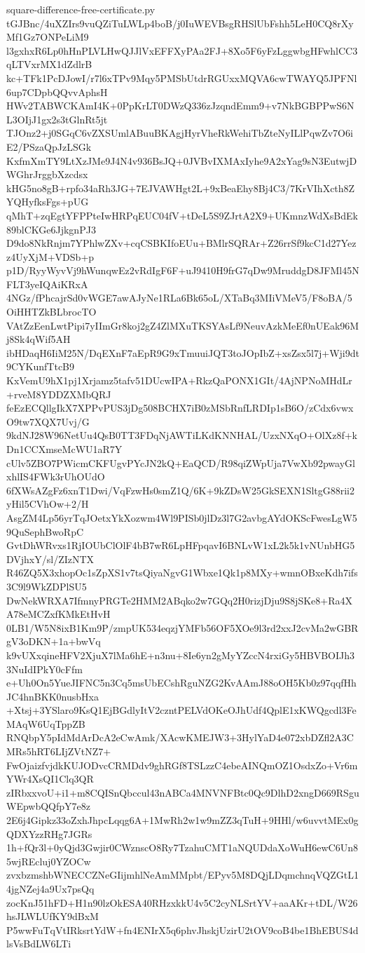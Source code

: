 \documentclass[11pt]{article}
\theoremstyle{definition}
\theoremstyle{remark}
\begin{document}
\begin{filecontents*}[overwrite]{square-difference-free-certificate.py}
tGJBnc/4uXZIrs9vuQZiTuLWLp4boB/j0IuWEVBsgRHSlUbFshh5LeH0CQ8rXyMf1Gz7ONPeLiM9
l3gxhxR6Lp0hHnPLVLHwQJJlVxEFFXyPAa2FJ+8Xo5F6yFzLggwbgHFwhlCC3qLTVxrMX1dZdlrB
kc+TFk1PcDJowI/r7l6xTPv9Mqy5PMSbUtdrRGUxxMQVA6cwTWAYQ5JPFNl6up7CDpbQQvvAphsH
HWv2TABWCKAmI4K+0PpKrLT0DWzQ336zJzqndEmm9+v7NkBGBPPwS6NL3OIjJ1gx2s3tGlnRt5jt
TJOnz2+j0SGqC6vZXSUmlABuuBKAgjHyrVheRkWehiTbZteNyILlPqwZv7O6iE2/PSzaQpJzLSGk
KxfmXmTY9LtXzJMe9J4N4v936BsJQ+0JVBvIXMAxIyhe9A2xYag9sN3EutwjDWGhrJrggbXzcdsx
kHG5no8gB+rpfo34aRh3JG+7EJVAWHgt2L+9xBeaEhy8Bj4C3/7KrVIhXcth8ZYQHyfksFgs+pUG
qMhT+zqEgtYFPPteIwHRPqEUC04fV+tDeL5S9ZJrtA2X9+UKmnzWdXsBdEk89blCKGe6JjkgnPJ3
D9do8NkRnjm7YPhlwZXv+cqCSBKIfoEUu+BMlrSQRAr+Z26rrSf9kcC1d27Yezz4UyXjM+VDSb+p
p1D/RyyWyvVj9hWunqwEz2vRdIgF6F+uJ9410H9frG7qDw9MruddgD8JFMl45NFLT3yeIQAiKRxA
4NGz/fPhcajrSd0vWGE7awAJyNe1RLa6Bk65oL/XTaBq3MIiVMeV5/F8oBA/5OiHHTZkBLbrocTO
VAtZzEenLwtPipi7yIImGr8koj2gZ4ZlMXuTKSYAsLf9NeuvAzkMeEf0nUEak96Mj8Sk4qWif5AH
ibHDaqH6IiM25N/DqEXnF7aEpR9G9xTmuuiJQT3toJOpIbZ+xsZsx5l7j+Wji9dt9CYKunfTtcB9
KxVemU9hX1pj1Xrjamz5tafv51DUcwIPA+RkzQaPONX1GIt/4AjNPNoMHdLr+rveM8YDDZXMbQRJ
feEzECQllgIkX7XPPvPUS3jDg508BCHX7iB0zMSbRnfLRDIp1sB6O/zCdx6vwxO9tw7XQX7Uvj/G
9kdNJ28W96NetUu4QsB0TT3FDqNjAWTiLKdKNNHAL/UzxNXqO+OlXz8f+kDn1CCXmseMcWU1aR7Y
cUlv5ZBO7PWicmCKFUgvPYcJN2kQ+EaQCD/R98qiZWpUja7VwXb92pwayGlxhlIS4FWk3rUhOUdO
6fXWsAZgFz6xnT1Dwi/VqFzwHs0smZ1Q/6K+9kZDsW25GkSEXN1SltgG88rii2yHil5CVhOw+2/H
AsgZM4Lp56yrTqJOetxYkXozwm4Wl9PISb0jlDz3l7G2avbgAYdOKScFwesLgW59QuSephBwoRpC
GvtDhWRvxs1RjIOUbClOlF4bB7wR6LpHFpqavI6BNLvW1xL2k5k1vNUnbHG5DVjhxY/sl/ZIzNTX
R46ZQ5X3xhopOc1sZpXS1v7tsQiyaNgvG1Wbxe1Qk1p8MXy+wmnOBxeKdh7ifs3C9l9WkZDPlSU5
DwNekWRXA7IfmnyPRGTe2HMM2ABqko2w7GQq2H0rizjDju9S8jSKe8+Ra4XA78eMCZxfKMkEtHvH
0LB1/W5N8ixB1Km9P/zmpUK534eqzjYMFb56OF5XOe9l3rd2xxJ2cvMa2wGBRgV3oDKN+1a+bwVq
k9vUXxqineHFV2XjuX7lMa6hE+n3nu+8Ie6yn2gMyYZccN4rxiGy5HBVBOIJh33NuIdIPkY0cFfm
e+Uh0On5YueJIFNC5n3Cq5msUbECshRguNZG2KvAAmJ88oOH5Kb0z97qqfHhJC4hnBKK0nusbHxa
+Xtsj+3YSlaro9KsQ1EjBGdlyItV2czntPELVdOKeOJhUdf4QplE1xKWQgcdl3FeMAqW6UqTppZB
RNQbpY5pIdMdArDcA2eCwAmk/XAcwKMEJW3+3HylYaD4e072xbDZfl2A3CMRs5hRT6LIjZVtNZ7+
FwOjaizfvjdkKUJODvcCRMDdv9ghRGf8TSLzzC4ebeAINQmOZ1OsdxZo+Vr6mYWr4XsQI1Clq3QR
zIRbxxvoU+i1+m8CQISnQbccul43nABCa4MNVNFBtc0Qc9DlhD2xngD669RSguWEpwbQQfpY7e8z
2E6j4Gipkz33oZxhJhpcLqqg6A+1MwRh2w1w9mZZ3qTuH+9HHl/w6uvvtMEx0gQDXYzzRHg7JGRs
1h+fQr3l+0yQjd3Gwjir0CWznscO8Ry7TzahuCMT1aNQUDdaXoWuH6ewC6Un85wjREcluj0YZOCw
zvxbzmshbWNECCZNeGIijmhlNeAmMMpbt/EPyv5M8DQjLDqmchnqVQZGtL14jgNZej4a9Ux7psQq
zocKnJ51hFD+H1n90lzOkESA40RHzxkkU4v5C2cyNLSrtYV+aaAKr+tDL/W26hsJLWLUfKY9dBxM
P5wwFuTqVtIRksrtYdW+fn4ENIrX5q6phvJhskjUzirU2tOV9coB4be1BhEBUS4dlsVsBdLW6LTi

\end{filecontents*}
\end{document}
